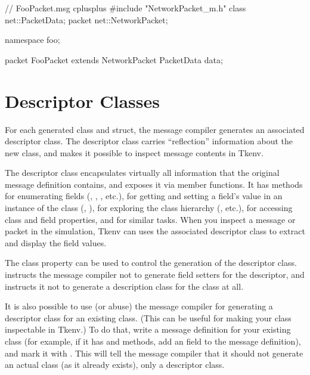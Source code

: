 \begin{msg}
// FooPacket.msg
cplusplus {{
#include "NetworkPacket_m.h"
}}
class net::PacketData;
packet net::NetworkPacket;

namespace foo;

packet FooPacket extends NetworkPacket
{
    PacketData data;
}
\end{msg}



\section{Descriptor Classes}
\label{sec:msg-defs:descriptor-classes}

For each generated class and struct, the message compiler generates an
associated descriptor class. The descriptor class carries ``reflection''
information about the new class, and makes it possible to inspect message
contents in Tkenv.

The descriptor class encapsulates virtually all information that the
original message definition contains, and exposes it via member functions.
It has methods for enumerating fields (,
, , etc.), for getting
and setting a field's value in an instance of the class
(, ), for exploring the
class hierarchy (, etc.), for accessing
class and field properties, and for similar tasks. When you inspect a
message or packet in the simulation, Tkenv can uses the associated
descriptor class to extract and display the field values.

The  class property can be used to control the generation
of the descriptor class.  instructs the message
compiler not to generate field setters for the descriptor, and
 instructs it not to generate a description class
for the class at all.

It is also possible to use (or abuse) the message compiler for generating a
descriptor class for an existing class. (This can be useful for making your
class inspectable in Tkenv.) To do that, write a message definition for
your existing class (for example, if it has  and
 methods, add an  field to the message
definition), and mark it with . This will tell the
message compiler that it should not generate an actual class (as it already
exists), only a descriptor class.




